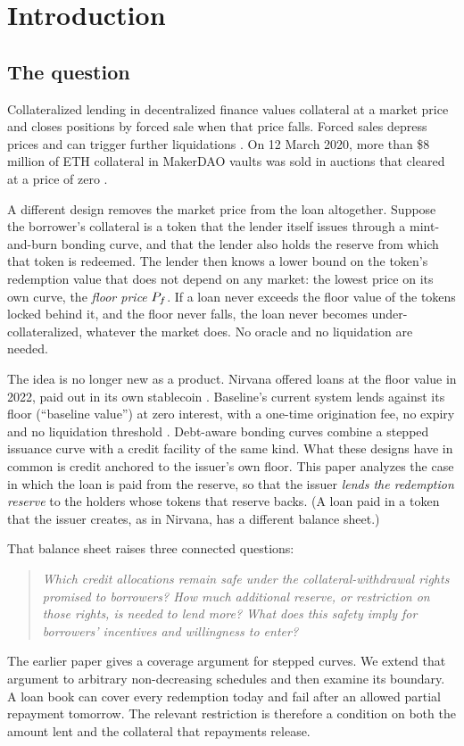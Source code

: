 \section{Introduction}\label{sec:intro}

\subsection{The question}

Collateralized lending in decentralized finance values collateral at a market price and closes positions by forced sale when that price falls. Forced sales depress prices and can trigger further liquidations \citep{perez2021,qin2021liquidations,lehar2022,chiu2023}. On 12 March 2020, more than \$8 million of ETH collateral in MakerDAO vaults was sold in auctions that cleared at a price of zero \citep{glassnodeblackthursday}.

A different design removes the market price from the loan altogether. Suppose the borrower's collateral is a token that the lender itself issues through a mint-and-burn bonding curve, and that the lender also holds the reserve from which that token is redeemed. The lender then knows a lower bound on the token's redemption value that does not depend on any market: the lowest price on its own curve, the \emph{floor price} $P_f$. If a loan never exceeds the floor value of the tokens locked behind it, and the floor never falls, the loan never becomes under-collateralized, whatever the market does. No oracle and no liquidation are needed.

The idea is no longer new as a product. Nirvana offered loans at the floor value in 2022, paid out in its own stablecoin \citep{nirvanadocs}. Baseline's current system lends against its floor (``baseline value'') at zero interest, with a one-time origination fee, no expiry and no liquidation threshold \citep{baselinedocs}. Debt-aware bonding curves \vone{} combine a stepped issuance curve with a credit facility of the same kind. What these designs have in common is credit anchored to the issuer's own floor. This paper analyzes the case in which the loan is paid from the reserve, so that the issuer \emph{lends the redemption reserve} to the holders whose tokens that reserve backs. (A loan paid in a token that the issuer creates, as in Nirvana, has a different balance sheet.)

That balance sheet raises three connected questions:
\begin{quote}
\emph{Which credit allocations remain safe under the collateral-withdrawal rights promised to borrowers? How much additional reserve, or restriction on those rights, is needed to lend more? What does this safety imply for borrowers' incentives and willingness to enter?}
\end{quote}
The earlier paper \vone{} gives a coverage argument for stepped curves. We extend that argument to arbitrary non-decreasing schedules and then examine its boundary. A loan book can cover every redemption today and fail after an allowed partial repayment tomorrow. The relevant restriction is therefore a condition on both the amount lent and the collateral that repayments release.

